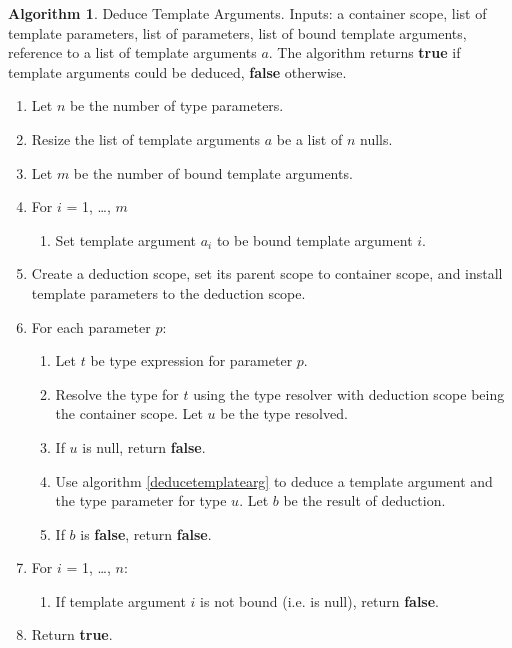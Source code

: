\documentclass[a4paper,oneside,11pt]{book}
\theoremstyle{definition}
\newtheorem{algo}{Algorithm}[section]
\begin{document}
\begin{algo}\label{deducetemplatearguments} Deduce Template Arguments.
Inputs: a container scope, list of template parameters, list of parameters, list of bound template arguments,
reference to a list of template arguments $a$.
The algorithm returns \textbf{true} if template arguments could be deduced, \textbf{false} otherwise.
\begin{enumerate}
\item
Let $n$ be the number of type parameters.
\item
Resize the list of template arguments $a$ be a list of $n$ nulls.
\item
Let $m$ be the number of bound template arguments.
\item
For $i$ = 1, \ldots, $m$
\begin{enumerate}
\item
Set template argument $a_i$ to be bound template argument $i$.
\end{enumerate}
\item
Create a deduction scope, set its parent scope to container scope, and install template parameters to the deduction scope.
\item
For each parameter $p$:
\begin{enumerate}
\item
Let $t$ be type expression for parameter $p$.
\item
Resolve the type for $t$ using the type resolver with deduction scope being the container scope. Let $u$ be the type resolved.
\item
If $u$ is null, return \textbf{false}.
\item
Use algorithm \ref{deducetemplatearg} to deduce a template argument and the type parameter for type $u$. Let $b$ be the result of deduction.
\item
If $b$ is \textbf{false}, return \textbf{false}.
\end{enumerate}
\item
For $i$ = 1, \ldots, $n$:
\begin{enumerate}
\item
If template argument $i$ is not bound (i.e. is null), return \textbf{false}.
\end{enumerate}
\item
Return \textbf{true}.
\end{enumerate}
\end{algo}
\end{document}
